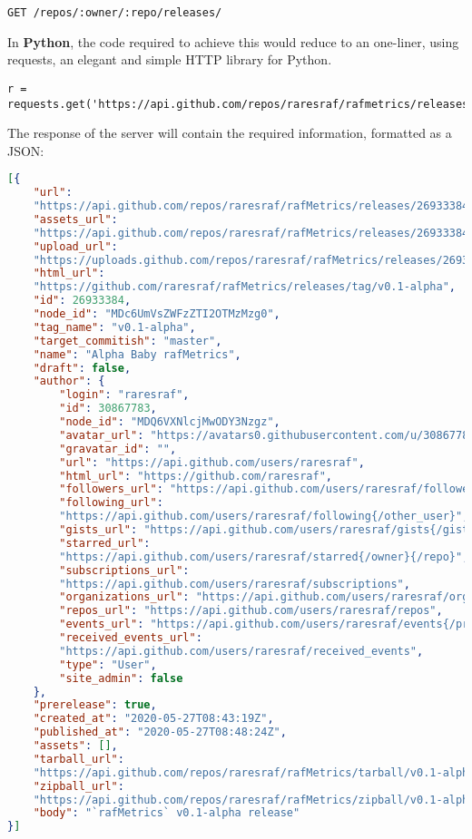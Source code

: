 \begin{verbatim}
GET /repos/:owner/:repo/releases/
\end{verbatim}

In \textbf{Python}, the code required to achieve this would reduce to an one-liner, using requests, an elegant and simple HTTP library for Python.

\begin{verbatim}
r = requests.get('https://api.github.com/repos/raresraf/rafmetrics/releases')
\end{verbatim}

The response of the server will contain the required information, formatted as a JSON:
\begin{lstlisting}[language=json,firstnumber=1]
[{
    "url":
    "https://api.github.com/repos/raresraf/rafMetrics/releases/26933384",
    "assets_url":
    "https://api.github.com/repos/raresraf/rafMetrics/releases/26933384/assets",
    "upload_url":
    "https://uploads.github.com/repos/raresraf/rafMetrics/releases/26933384/assets{?name,label}",
    "html_url":
    "https://github.com/raresraf/rafMetrics/releases/tag/v0.1-alpha",
    "id": 26933384,
    "node_id": "MDc6UmVsZWFzZTI2OTMzMzg0",
    "tag_name": "v0.1-alpha",
    "target_commitish": "master",
    "name": "Alpha Baby rafMetrics",
    "draft": false,
    "author": {
        "login": "raresraf",
        "id": 30867783,
        "node_id": "MDQ6VXNlcjMwODY3Nzgz",
        "avatar_url": "https://avatars0.githubusercontent.com/u/30867783?v=4",
        "gravatar_id": "",
        "url": "https://api.github.com/users/raresraf",
        "html_url": "https://github.com/raresraf",
        "followers_url": "https://api.github.com/users/raresraf/followers",
        "following_url":
        "https://api.github.com/users/raresraf/following{/other_user}",
        "gists_url": "https://api.github.com/users/raresraf/gists{/gist_id}",
        "starred_url":
        "https://api.github.com/users/raresraf/starred{/owner}{/repo}",
        "subscriptions_url":
        "https://api.github.com/users/raresraf/subscriptions",
        "organizations_url": "https://api.github.com/users/raresraf/orgs",
        "repos_url": "https://api.github.com/users/raresraf/repos",
        "events_url": "https://api.github.com/users/raresraf/events{/privacy}",
        "received_events_url":
        "https://api.github.com/users/raresraf/received_events",
        "type": "User",
        "site_admin": false
    },
    "prerelease": true,
    "created_at": "2020-05-27T08:43:19Z",
    "published_at": "2020-05-27T08:48:24Z",
    "assets": [],
    "tarball_url":
    "https://api.github.com/repos/raresraf/rafMetrics/tarball/v0.1-alpha",
    "zipball_url":
    "https://api.github.com/repos/raresraf/rafMetrics/zipball/v0.1-alpha",
    "body": "`rafMetrics` v0.1-alpha release"
}]
\end{lstlisting}

